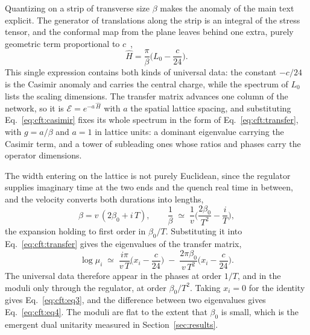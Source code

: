 Quantizing on a strip of transverse size $\beta$ makes the anomaly of the main text explicit. The generator of translations along the strip is an integral of the stress tensor, and the conformal map from the plane leaves behind one extra, purely geometric term proportional to $c$~\cite{carignano_tagliacozzo2025},
\begin{equation}
    \hat H = \frac{\pi}{\beta}\Big(L_0 - \frac{c}{24}\Big).
    \label{eq:cft:casimir}
\end{equation}
This single expression contains both kinds of universal data: the constant $-c/24$ is the Casimir anomaly and carries the central charge, while the spectrum of $L_0$ lists the scaling dimensions. The transfer matrix advances one column of the network, so it is $\mathcal{E}=e^{-a\,\hat H}$ with $a$ the spatial lattice spacing, and substituting Eq.~\eqref{eq:cft:casimir} fixes its whole spectrum in the form of Eq.~\eqref{eq:cft:transfer}, with $g=a/\beta$ and $a=1$ in lattice units: a dominant eigenvalue carrying the Casimir term, and a tower of subleading ones whose ratios and phases carry the operator dimensions.

The width entering on the lattice is not purely Euclidean, since the regulator supplies imaginary time at the two ends and the quench real time in between, and the velocity converts both durations into lengths,
\begin{equation}
    \beta = v\,(2\beta_0 + i\,T),
    \qquad
    \frac{1}{\beta} \;\simeq\; \frac{1}{v}\Big(\frac{2\beta_0}{T^2} - \frac{i}{T}\Big),
    \label{eq:cft:continuation}
\end{equation}
the expansion holding to first order in $\beta_0/T$. Substituting it into Eq.~\eqref{eq:cft:transfer} gives the eigenvalues of the transfer matrix,
\begin{equation}
    \log\mu_i \;\simeq\; \frac{i\pi}{v\,T}\Big(x_i-\frac{c}{24}\Big)
      \;-\; \frac{2\pi\beta_0}{v\,T^2}\Big(x_i-\frac{c}{24}\Big).
    \label{eq:cft:contexpand}
\end{equation}
The universal data therefore appear in the phases at order $1/T$, and in the moduli only through the regulator, at order $\beta_0/T^2$. Taking $x_i=0$ for the identity gives Eq.~\eqref{eq:cft:eq3}, and the difference between two eigenvalues gives Eq.~\eqref{eq:cft:eq4}. The moduli are flat to the extent that $\beta_0$ is small, which is the emergent dual unitarity measured in Section~\ref{sec:results}.


